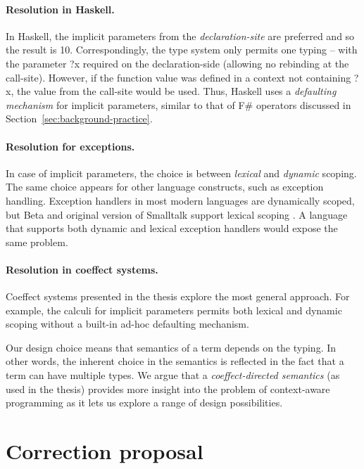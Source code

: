 \documentclass[
		twoside,openright,titlepage,numbers=noenddot,headinclude,%
                footinclude=true,cleardoublepage=empty,
                BCOR=10mm,paper=a4,fontsize=10pt, %
                ngerman,american, %
                ]{scrreprt}
\newcommand{\ident}[1]{\textnormal{\sffamily #1}}
\begin{document}
\paragraph{Resolution in Haskell.}
In Haskell, the implicit parameters from the \emph{declaration-site} are preferred and so the result
is 10. Correspondingly, the type system only permits one typing -- with the parameter \ident{?x}
required on the declaration-side (allowing no rebinding at the call-site). However, if the function
value was defined in a context not containing \ident{?x}, the value from the call-site would be used.
Thus, Haskell uses a \emph{defaulting mechanism} for implicit parameters, similar to that of F\#
operators discussed in Section~\ref{sec:background-practice}.

\paragraph{Resolution for exceptions.}
In case of implicit parameters, the choice is between \emph{lexical} and \emph{dynamic} scoping.
The same choice appears for other language constructs, such as exception handling. Exception
handlers in most modern languages are dynamically scoped, but Beta and original version of Smalltalk
support lexical scoping \cite{app-exceptions}. A language that supports both dynamic and lexical
exception handlers would expose the same problem.

\paragraph{Resolution in coeffect systems.}
Coeffect systems presented in the thesis explore the most general approach. For example, the
calculi for implicit parameters permits both lexical and dynamic scoping without a built-in ad-hoc
defaulting mechanism.

Our design choice means that semantics of a term depends on the typing. In other words, the
inherent choice in the semantics is reflected in the fact that a term can have multiple types.
We argue that a \emph{coeffect-directed semantics} (as used in the thesis) provides more insight
into the problem of context-aware programming as it lets us explore a range of design
possibilities.

\section{Correction proposal}
\label{sec:proposal}
\vspace{-1em}
\end{document}
